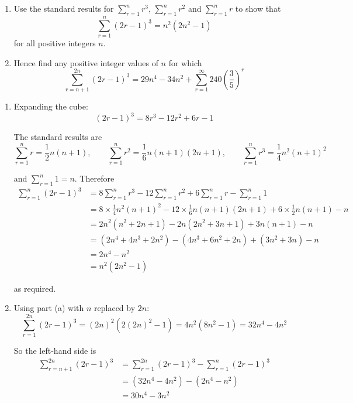 \documentclass[leqno]{article}
\begin{document}
\begin{enumerate}[
  label=\textbf{\arabic*.},
  leftmargin=*,
  topsep=0pt,
  partopsep=0pt,
  parsep=0pt
]
\begin{enumerate}[label=\textbf{(\alph*)}]
  \item Use the standard results for $\sum_{r=1}^{n} r^3$, $\sum_{r=1}^{n} r^2$ and $\sum_{r=1}^{n} r$ to show that
  \[\sum_{r=1}^{n} (2r-1)^3 = n^2\left(2n^2 - 1\right)\]
  for all positive integers $n$.  \\
  \item Hence find any positive integer values of $n$ for which
  \[\sum_{r=n+1}^{2n} (2r-1)^3 = 29n^4 - 34n^2 + \sum_{r=1}^{\infty} 240\left(\dfrac{3}{5}\right)^{r}\] 
\end{enumerate}

\vspace*{10pt}

\begin{djsSolution}
\begin{enumerate}[label=\textbf{(\alph*)}, start=1]
  \item Expanding the cube:
\[
(2r-1)^3=8r^3-12r^2+6r-1
\]

The standard results are
\[
\sum_{r=1}^{n} r=\frac12 n(n+1),\qquad \sum_{r=1}^{n} r^2=\frac16 n(n+1)(2n+1),\qquad \sum_{r=1}^{n} r^3=\frac14 n^2(n+1)^2
\]

and \(\sum_{r=1}^{n} 1=n\). Therefore
\begin{align*}
\sum_{r=1}^{n}(2r-1)^3&=8\sum_{r=1}^{n} r^3-12\sum_{r=1}^{n} r^2+6\sum_{r=1}^{n} r-\sum_{r=1}^{n}1\\
&=8\times\frac14 n^2(n+1)^2-12\times\frac16 n(n+1)(2n+1)+6\times\frac12 n(n+1)-n\\
&=2n^2(n^2+2n+1)-2n(2n^2+3n+1)+3n(n+1)-n\\
&=\left(2n^4+4n^3+2n^2\right)-\left(4n^3+6n^2+2n\right)+\left(3n^2+3n\right)-n\\
&=2n^4-n^2\\
&=n^2\left(2n^2-1\right)
\end{align*}

as required.

  \item Using part (a) with \(n\) replaced by \(2n\):
\[
\sum_{r=1}^{2n}(2r-1)^3=(2n)^2\left(2(2n)^2-1\right)=4n^2\left(8n^2-1\right)=32n^4-4n^2
\]

So the left-hand side is
\begin{align*}
\sum_{r=n+1}^{2n}(2r-1)^3&=\sum_{r=1}^{2n}(2r-1)^3-\sum_{r=1}^{n}(2r-1)^3\\
&=\left(32n^4-4n^2\right)-\left(2n^4-n^2\right)\\
&=30n^4-3n^2
\end{align*}


\end{enumerate}
\end{djsSolution}
\end{enumerate}
\end{document}

